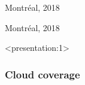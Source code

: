 
{{
\begin{frame}[plain, b]


	\raggedleft \color{white} Montréal, 2018
\end{frame}
}

{
	\begin{frame}[plain, b]
			
		\raggedleft \color{white} Montréal, 2018
			
	\end{frame}
	
}

%	
%	


\begin{frame}<presentation:1>
\frametitle{Cloud coverage}
\centering

\def\imagewidth{1.5cm}



\end{frame}}
